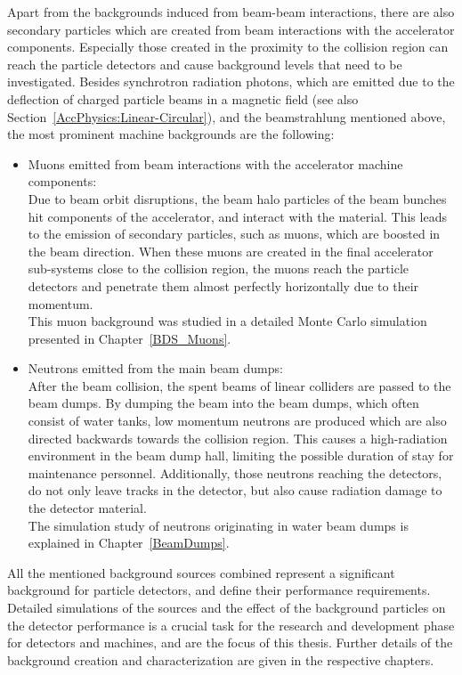 Apart from the backgrounds induced from beam-beam interactions, there are also secondary particles which are created from beam interactions with the accelerator components.
Especially those created in the proximity to the collision region can reach the particle detectors and cause background levels that need to be investigated.
Besides synchrotron radiation photons, which are emitted due to the deflection of charged particle beams in a magnetic field (see also Section~\ref{AccPhysics:Linear-Circular}), and the beamstrahlung mentioned above, the most prominent machine backgrounds are the following:
\begin{itemize}
 \item Muons emitted from beam interactions with the accelerator machine components:
 \\Due to beam orbit disruptions, the beam halo particles of the beam bunches hit components of the accelerator, and interact with the material.
 This leads to the emission of secondary particles, such as muons, which are boosted in the beam direction.
 When these muons are created in the final accelerator sub-systems close to the collision region, the muons reach the particle detectors and penetrate them almost perfectly horizontally due to their momentum.
 \\This muon background was studied in a detailed Monte Carlo simulation presented in Chapter~\ref{BDS_Muons}.
 \item Neutrons emitted from the main beam dumps:
 \\After the beam collision, the spent beams of linear colliders are passed to the beam dumps.
 By dumping the beam into the beam dumps, which often consist of water tanks, low momentum neutrons are produced which are also directed backwards towards the collision region.
 This causes a high-radiation environment in the beam dump hall, limiting the possible duration of stay for maintenance personnel.
 Additionally, those neutrons reaching the detectors, do not only leave tracks in the detector, but also cause radiation damage to the detector material.
 \\The simulation study of neutrons originating in water beam dumps is explained in Chapter~\ref{BeamDumps}.
\end{itemize}
All the mentioned background sources combined represent a significant background for particle detectors, and define their performance requirements.
Detailed simulations of the sources and the effect of the background particles on the detector performance is a crucial task for the research and development phase for detectors and machines, and are the focus of this thesis.
Further details of the background creation and characterization are given in the respective chapters.